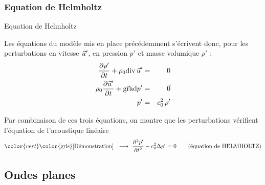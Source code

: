 \subsubsection{Equation de Helmholtz}
\begin{frame}{Equation de Helmholtz}

\small



\medskip

\pause
Les équations du modèle mis en place précédemment 
s'écrivent donc, pour les perturbations en vitesse $\vec{u}'$, 
en pression $p'$ et masse volumique $\rho'$ :
\begin{eqnarray}
	\displaystyle \frac{\partial \rho'}{\partial t} + \rho_0\mbox{\rm div}\, \vec{u}' & = & 0
	\\
	\rho_0 \displaystyle \frac{\partial \vec{u}'}{\partial t} + \vec{\mbox{\rm gra}}\mbox{\rm d} p' & = & \vec{0}
	\\
	p' & = & c_0^2 \, \rho'
\end{eqnarray}

\medskip

\pause
Par combinaison de ces trois équations, on montre que les perturbations
vérifient l'équation de l'acoustique linéaire
\begin{equation}
	\color{vert}
	\mbox{\color{gris} [Démonstration] \; $\longrightarrow$ \;}
	\ddpdt{p'} - c_0^2 \Delta p' = 0 \qquad \mbox{(équation de HELMHOLTZ)}
\end{equation}

\vspace{0mm}

\end{frame}

\subsection{Ondes planes}

